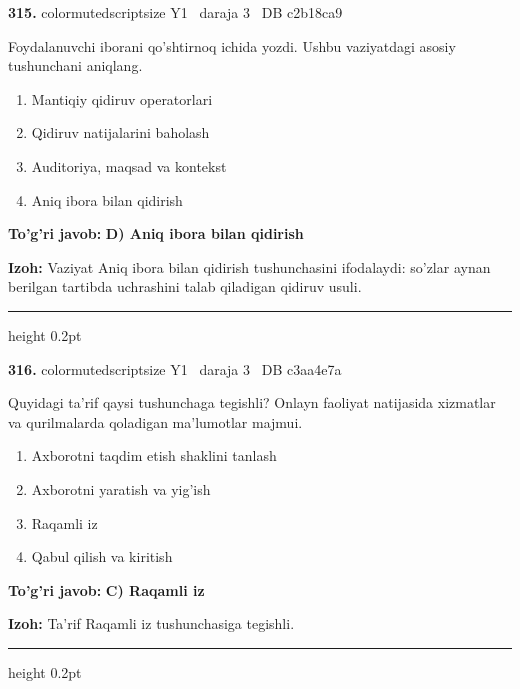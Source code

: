 \documentclass[10pt,a4paper,oneside]{article}
\begin{document}
\noindent\textbf{\color{ink}315.}  {color{muted}scriptsize Y1 \textbullet\ daraja 3 \textbullet\ DB c2b18ca9}
\par
Foydalanuvchi iborani qo'shtirnoq ichida yozdi. Ushbu vaziyatdagi asosiy tushunchani aniqlang.
\begin{enumerate}[label=\Alph*),leftmargin=9mm]
\item Mantiqiy qidiruv operatorlari
\item Qidiruv natijalarini baholash
\item Auditoriya, maqsad va kontekst
\item Aniq ibora bilan qidirish
\end{enumerate}
\begin{tcolorbox}[enhanced,breakable,colback=teal!4,colframe=teal!50!black,boxrule=0.5pt,arc=1.1mm,left=3mm,right=3mm,top=1.7mm,bottom=1.7mm,before skip=2mm,after skip=2mm]
\textbf{\color{teal}To'g'ri javob:} \textbf{D) Aniq ibora bilan qidirish}
\par\smallskip
\textbf{Izoh:} Vaziyat Aniq ibora bilan qidirish tushunchasini ifodalaydi: so'zlar aynan berilgan tartibda uchrashini talab qiladigan qidiruv usuli.
\end{tcolorbox}
\vspace{2mm}\hrule height 0.2pt \vspace{3mm}

\noindent\textbf{\color{ink}316.}  {color{muted}scriptsize Y1 \textbullet\ daraja 3 \textbullet\ DB c3aa4e7a}
\par
Quyidagi ta'rif qaysi tushunchaga tegishli? Onlayn faoliyat natijasida xizmatlar va qurilmalarda qoladigan ma'lumotlar majmui.
\begin{enumerate}[label=\Alph*),leftmargin=9mm]
\item Axborotni taqdim etish shaklini tanlash
\item Axborotni yaratish va yig'ish
\item Raqamli iz
\item Qabul qilish va kiritish
\end{enumerate}
\begin{tcolorbox}[enhanced,breakable,colback=teal!4,colframe=teal!50!black,boxrule=0.5pt,arc=1.1mm,left=3mm,right=3mm,top=1.7mm,bottom=1.7mm,before skip=2mm,after skip=2mm]
\textbf{\color{teal}To'g'ri javob:} \textbf{C) Raqamli iz}
\par\smallskip
\textbf{Izoh:} Ta'rif Raqamli iz tushunchasiga tegishli.
\end{tcolorbox}
\vspace{2mm}\hrule height 0.2pt \vspace{3mm}
\end{document}
